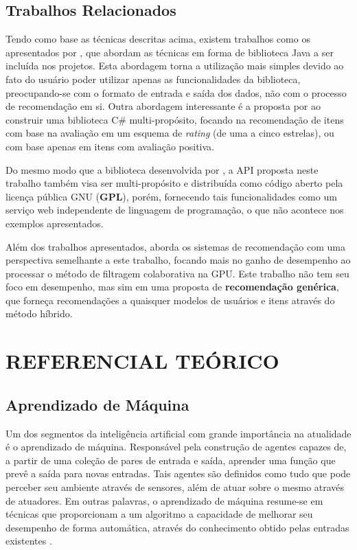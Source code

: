 \documentclass[12pt, openright, oneside, a4paper, brazil]{abntex2}
\begin{document}
\section{Trabalhos Relacionados}

Tendo como base as técnicas descritas acima, existem trabalhos como os apresentados por , que abordam as técnicas em forma de biblioteca Java a ser incluída nos projetos. Esta abordagem torna a utilização mais simples devido ao fato do usuário poder utilizar apenas as funcionalidades da biblioteca, preocupando-se com o formato de entrada e saída dos dados, não com o processo de recomendação em si. Outra abordagem interessante é a proposta por  ao construir uma biblioteca C\# multi-propósito, focando na recomendação de itens com base na avaliação em um esquema de \textit{rating} (de uma a cinco estrelas), ou com base apenas em itens com avaliação positiva.

Do mesmo modo que a biblioteca desenvolvida por , a API proposta neste trabalho também visa ser multi-propósito e distribuída como código aberto pela licença pública GNU (\textbf{GPL}), porém, fornecendo tais funcionalidades como um serviço web independente de linguagem de programação, o que não acontece nos exemplos apresentados.

Além dos trabalhos apresentados,  aborda os sistemas de recomendação com uma perspectiva semelhante a este trabalho, focando mais no ganho de desempenho ao processar o método de filtragem colaborativa na GPU. Este trabalho não tem seu foco em desempenho, mas sim em uma proposta de \textbf{recomendação genérica}, que forneça recomendações a quaisquer modelos de usuários e itens através do método híbrido.

%
%

\cleardoublepage

\chapter{REFERENCIAL TEÓRICO}

\section{Aprendizado de Máquina}

Um dos segmentos da inteligência artificial com grande importância na atualidade é o aprendizado de máquina. Responsável pela construção de agentes capazes de, a partir de uma coleção de pares de entrada e saída, aprender uma função que prevê a saída para novas entradas. Tais agentes são definidos como tudo que pode perceber seu ambiente através de sensores, além de atuar sobre o mesmo através de atuadores. Em outras palavras, o aprendizado de máquina resume-se em técnicas que proporcionam a um algoritmo a capacidade de melhorar seu desempenho de forma automática, através do conhecimento obtido pelas entradas existentes \cite{coppin2015inteligencia}.
\end{document}
